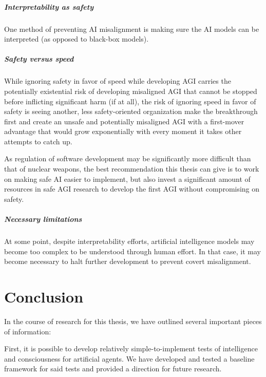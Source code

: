 \documentclass[masterthesis]{fer}
\begin{document}
\paragraph{Interpretability as safety}

One method of preventing AI misalignment is making sure the AI models can be interpreted (as opposed to black-box models).

\paragraph{Safety versus speed}

While ignoring safety in favor of speed while developing AGI carries the potentially existential risk of developing misaligned AGI that cannot be stopped before inflicting significant harm (if at all),
the risk of ignoring speed in favor of safety is seeing another, less safety-oriented organization make the breakthrough first and create an unsafe and potentially misaligned AGI with a first-mover advantage that would grow exponentially with every moment it takes other attempts to catch up.

As regulation of software development may be significantly more difficult than that of nuclear weapons,
the best recommendation this thesis can give is to work on making safe AI easier to implement, but also invest a significant amount of resources in safe AGI research to develop the first AGI without compromising on safety.

\paragraph{Necessary limitations}

At some point, despite interpretability efforts, artificial intelligence models may become too complex to be understood through human effort. In that case, it may become necessary to halt further development to prevent covert misalignment.

\chapter{Conclusion}
\label{chp:conclusion}

In the course of research for this thesis, we have outlined several important pieces of information:

First, it is possible to develop relatively simple-to-implement tests of intelligence and consciousness for artificial agents. We have developed and tested a baseline framework for said tests and provided a direction for future research.
\end{document}
